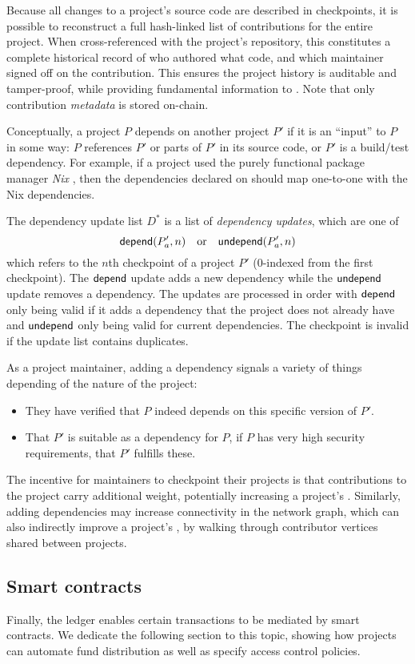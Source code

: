 Because all changes to a project's source code are described in checkpoints, it
is possible to reconstruct a full hash-linked list of contributions for the
entire project. When cross-referenced with the project's repository, this
constitutes a complete historical record of who authored what code, and which
maintainer signed off on the contribution. This ensures the project history is
auditable and tamper-proof, while providing fundamental information to
\osrank{}. Note that only contribution \emph{metadata} is stored
on-chain.

\label{s:dependencies}
Conceptually, a project $P$ depends on another project $P'$ if it is an
``input'' to $P$ in some way: $P$ references $P'$ or parts of $P'$ in its
source code, or $P'$ is a build/test dependency.  For example, if a project
used the purely functional package manager \emph{Nix} \cite{nix}, then the
dependencies declared on \oscoin{} should map one-to-one with the Nix
dependencies.

The dependency update list $D^*$ is a list of \emph{dependency
  updates}, which are one of
\[
    \mathsf{depend}(P'_a, n) \quad \text{or} \quad \mathsf{undepend}(P'_a, n)
\]
which refers to the $n$th checkpoint of a project $P'$ ($0$-indexed
from the first checkpoint). The $\mathsf{depend}$ update adds a new dependency
while the $\mathsf{undepend}$ update removes a dependency. The updates are
processed in order with $\mathsf{depend}$ only being valid if it adds a
dependency that the project does not already have and $\mathsf{undepend}$
only being valid for current dependencies. The checkpoint is invalid
if the update list contains duplicates.

As a project maintainer, adding a dependency signals a variety of things
depending of the nature of the project:
\begin{itemize}
\item They have verified that $P$ indeed depends on this specific
  version of $P'$.
\item That $P'$ is suitable as a dependency for $P$, \eg{} if $P$ has
  very high security requirements, that $P'$ fulfills these.
\end{itemize}

\noindent The incentive for maintainers to checkpoint their projects is that
contributions to the project carry additional weight, potentially increasing a
project's \osrank{}. Similarly, adding dependencies may increase
connectivity in the network graph, which can also indirectly improve a project's
\osrank{}, by walking through contributor vertices shared between projects.

\subsection{Smart contracts}

Finally, the ledger enables certain transactions to be mediated by smart contracts.
We dedicate the following section to this topic, showing how projects can automate
fund distribution as well as specify access control policies.

